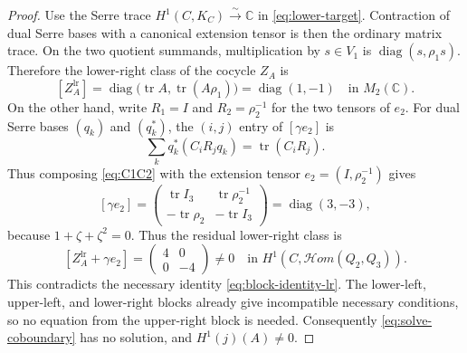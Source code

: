 \documentclass[11pt,a4paper,dvipsnames]{amsart}
\numberwithin{equation}{section}
\theoremstyle{plain}
\theoremstyle{definition}
\newcommand{\tr}{\operatorname{tr}}
\newcommand{\CC}{\mathbb C}
\newcommand{\cHom}{\mathcal{H}om}
\begin{document}
\begin{proof}
Use the Serre trace $H^1(C,K_C)\xrightarrow{\sim}\CC$ in
\eqref{eq:lower-target}.  Contraction of dual Serre bases with a canonical
extension tensor is then the ordinary matrix trace.  On the two
quotient summands, multiplication by $s\in V_1$ is
$\operatorname{diag}(s,\rho_1s)$.  Therefore the lower-right class of the
cocycle $Z_A$ is
\begin{equation}\label{eq:ZA-lr}
 [Z_A^{\mathrm{lr}}]
 =\operatorname{diag}\bigl(\tr A,\tr(A\rho_1)\bigr)
 =\operatorname{diag}(1,-1)
 \quad\text{in }M_2(\CC).
\end{equation}
On the other hand, write $R_1=I$ and $R_2=\rho_2^{-1}$ for the
two tensors of $e_2$.  For dual Serre bases $(q_k)$ and $(q_k^*)$, the
$(i,j)$ entry of $[\gamma e_2]$ is
$$
 \sum_k q_k^*(C_iR_jq_k)=\tr(C_iR_j).
$$
Thus composing \eqref{eq:C1C2} with the extension tensor
$e_2=(I,\rho_2^{-1})$ gives
\begin{equation}\label{eq:gamma-e2}
 [\gamma e_2]=
 \begin{pmatrix}
  \tr I_3&\tr\rho_2^{-1}\\
  -\tr\rho_2&-\tr I_3
 \end{pmatrix}
 =\operatorname{diag}(3,-3),
\end{equation}
because $1+\zeta+\zeta^2=0$.  Thus the residual lower-right class is
\begin{equation}\label{eq:final-matrix}
 [Z_A^{\mathrm{lr}}+\gamma e_2]
 =\begin{pmatrix}4&0\\0&-4\end{pmatrix}\neq0
 \quad\text{in }H^1\!\left(C,\cHom(Q_2,Q_3)\right).
\end{equation}
This contradicts the necessary identity
\eqref{eq:block-identity-lr}.  The lower-left, upper-left, and lower-right
blocks already give incompatible necessary conditions, so no equation
from the upper-right block is needed.  Consequently
\eqref{eq:solve-coboundary} has no solution, and
$H^1(j)(A)\neq0$.
\end{proof}
\end{document}
